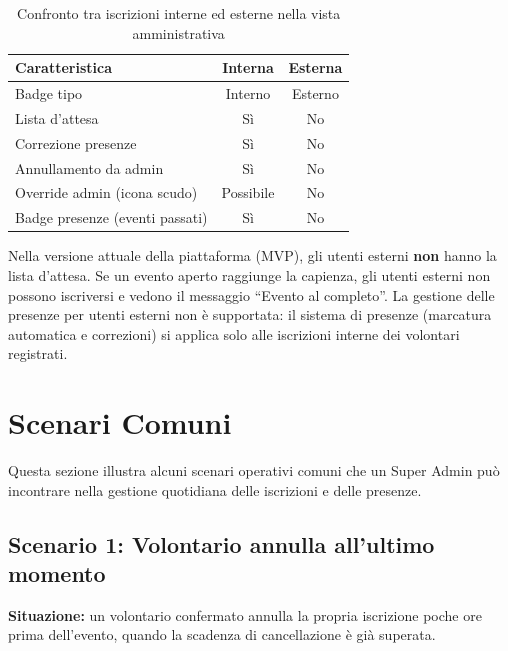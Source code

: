 \documentclass[a4paper,11pt,oneside]{book}
\begin{document}
\begin{table}[htbp]
\centering
\caption{Confronto tra iscrizioni interne ed esterne nella vista amministrativa}
\label{tab:confronto-iscrizioni}
\begin{tabularx}{\textwidth}{X c c}
\toprule
\textbf{Caratteristica} & \textbf{Interna} & \textbf{Esterna} \\
\midrule
Badge tipo                            & \textcolor{namoCyan}{Interno}   & \textcolor{namoOrange}{Esterno} \\
Lista d'attesa                        & S\`i           & No \\
Correzione presenze                   & S\`i           & No \\
Annullamento da admin                 & S\`i           & No \\
Override admin (icona scudo)          & Possibile      & No \\
Badge presenze (eventi passati)       & S\`i           & No \\
\bottomrule
\end{tabularx}
\end{table}

\begin{infobox}
Nella versione attuale della piattaforma (MVP), gli utenti esterni \textbf{non} hanno la lista d'attesa. Se un evento aperto raggiunge la capienza, gli utenti esterni non possono iscriversi e vedono il messaggio ``Evento al completo''. La gestione delle presenze per utenti esterni non \`e supportata: il sistema di presenze (marcatura automatica e correzioni) si applica solo alle iscrizioni interne dei volontari registrati.
\end{infobox}

\section{Scenari Comuni}
\label{sec:scenari-comuni}

Questa sezione illustra alcuni scenari operativi comuni che un Super Admin pu\`o incontrare nella gestione quotidiana delle iscrizioni e delle presenze.

\subsection{Scenario 1: Volontario annulla all'ultimo momento}

\textbf{Situazione:} un volontario confermato annulla la propria iscrizione poche ore prima dell'evento, quando la scadenza di cancellazione \`e gi\`a superata.
\end{document}
